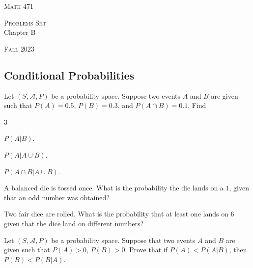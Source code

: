 


\hrulefill

\begin{minipage}{0.33\textwidth}
\textsc{Math 471}
\end{minipage} \hfill 
\begin{minipage}{0.32\textwidth}
\centering
\textsc{Problems Set} \\
Chapter B
\end{minipage}
 \hfill 
 \begin{minipage}{0.33\textwidth}
 \flushright \textsc{Fall 2023}
 \end{minipage}

\hrulefill

\setcounter{section}{2}

\subsection{Conditional Probabilities}
	
	\begin{problem}
	Let $(S, \mathcal{A} , P )$ be a probability space. Suppose two events $A$ and $B$ are given such that $P (A) = 0.5$, $P(B) = 0.3$, and $P (A \cap B) = 0.1$. Find
		\begin{enumerate}[label=\alph*)]
		\end{enumerate}			
	\end{problem}

	\begin{problem}
	A balanced die is tossed once. What is the probability the die lands on a $1$, given that an odd number was obtained?
	\end{problem}

	\begin{problem}
	Two fair dice are rolled. What is the probability that at least one lands on 6 given that the dice land on different numbers?
	\end{problem}

	\begin{problem}
	Let $(S , \mathcal{A} , P)$ be a probability space. Suppose that two events $A$ and $B$ are given such that $P (A) > 0$, $P (B) > 0$. Prove that if $P (A) < P (A | B)$, then $P (B) < P (B | A)$.
	\end{problem}
	
